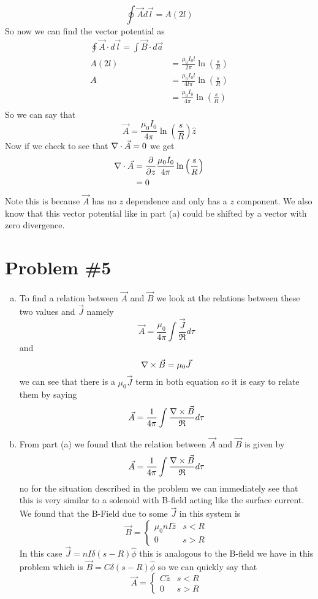 \documentclass[11pt]{article}
\numberwithin{equation}{section}
\newcommand{\grad}{\bold\nabla}
\newcommand{\scrptR}{\mathfrak{R}}
\begin{document}
\begin{enumerate}[(a)]
$$\oint\vec{A}\dot d\vec{l} = A(2l)$$
So now we can find the vector potential as
\begin{align*}
\oint\vec{A}\cdot d\vec{l} = \int \vec{B}\cdot d\vec{a}\\
A(2l) &= \frac{\mu_0I_0l}{2\pi} \ln\left(\frac{s}{R}\right)\\
A &= \frac{\mu_0I_0l}{4l\pi} \ln\left(\frac{s}{R}\right)\\
&= \frac{\mu_0I_0}{4\pi} \ln\left(\frac{s}{R}\right)\\
\end{align*}
So we can say that
$$\vec{A} =  \frac{\mu_0I_0}{4\pi} \ln\left(\frac{s}{R}\right)\hat{z}$$
Now if we check to see that $\grad\cdot\vec{A} = 0$ we get
\begin{align*}
\grad\cdot\vec{A} &= \frac{\partial}{\partial z}\frac{\mu_0I_0}{4\pi} \ln\left(\frac{s}{R}\right)\\
&=0
\end{align*}
Note this is because $\vec{A}$ has no $z$ dependence and only has a $z$ component. We also know that this vector potential like in part (a) could be shifted by a vector with zero divergence.
\end{enumerate}

\section{Problem \#5}
\begin{enumerate}[(a)]
\item
To find a relation between $\vec{A}$ and $\vec{B}$ we look at the relations between these two values and $\vec{J}$ namely 
$$\vec{A} = \frac{\mu_0}{4\pi}\int\frac{\vec{J}}{\scrptR}d\tau$$
and 
$$\grad\times\vec{B} = \mu_0\vec{J}$$
we can see that there is a $\mu_0\vec{J}$ term in both equation so it is easy to relate them by saying
$$\vec{A} = \frac{1}{4\pi}\int\frac{\grad\times\vec{B}}{\scrptR}d\tau$$

\item
From part (a) we found that the relation between $\vec{A}$ and $\vec{B}$ is given by
$$\vec{A} = \frac{1}{4\pi}\int\frac{\grad\times\vec{B}}{\scrptR}d\tau$$
no for the situation described in the problem we can immediately see that this is very similar to a solenoid with B-field acting like the surface current. We found that the B-Field due to some $\vec{J}$ in this system is 
$$\vec{B} = \left\{\begin{array}{lc}
		\mu_0nI\hat{z}	&s<R\\
		0		&s>R
		\end{array}\right.$$
In this case $\vec{J} = nI\delta(s-R)\hat{\phi}$ this is analogous to the B-field we have in this problem which is $\vec{B} = C\delta(s-R)\hat{\phi}$ so we can quickly say that
$$\vec{A} = \left\{\begin{array}{lc}
		C\hat{z}	&s<R\\
		0		&s>R
		\end{array}\right.$$

\end{enumerate}
\end{document}
